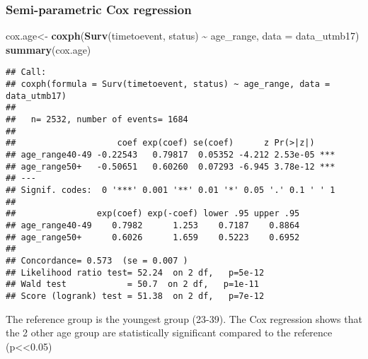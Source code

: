 \documentclass[
]{article}
\newenvironment{Shaded}{\begin{snugshade}}{\end{snugshade}}
\newcommand{\AttributeTok}[1]{\textcolor[rgb]{0.13,0.29,0.53}{#1}}
\newcommand{\FunctionTok}[1]{\textcolor[rgb]{0.13,0.29,0.53}{\textbf{#1}}}
\newcommand{\NormalTok}[1]{#1}
\newcommand{\OtherTok}[1]{\textcolor[rgb]{0.56,0.35,0.01}{#1}}
\newcommand{\SpecialCharTok}[1]{\textcolor[rgb]{0.81,0.36,0.00}{\textbf{#1}}}
\begin{document}
\hypertarget{semi-parametric-cox-regression}{%
\subsubsection{Semi-parametric Cox
regression}\label{semi-parametric-cox-regression}}

\begin{Shaded}
\begin{Highlighting}[]
\NormalTok{cox.age}\OtherTok{\textless{}{-}} \FunctionTok{coxph}\NormalTok{(}\FunctionTok{Surv}\NormalTok{(timetoevent, status) }\SpecialCharTok{\textasciitilde{}}\NormalTok{ age\_range, }\AttributeTok{data =}\NormalTok{ data\_utmb17)}
\FunctionTok{summary}\NormalTok{(cox.age)}
\end{Highlighting}
\end{Shaded}

\begin{verbatim}
## Call:
## coxph(formula = Surv(timetoevent, status) ~ age_range, data = data_utmb17)
## 
##   n= 2532, number of events= 1684 
## 
##                    coef exp(coef) se(coef)      z Pr(>|z|)    
## age_range40-49 -0.22543   0.79817  0.05352 -4.212 2.53e-05 ***
## age_range50+   -0.50651   0.60260  0.07293 -6.945 3.78e-12 ***
## ---
## Signif. codes:  0 '***' 0.001 '**' 0.01 '*' 0.05 '.' 0.1 ' ' 1
## 
##                exp(coef) exp(-coef) lower .95 upper .95
## age_range40-49    0.7982      1.253    0.7187    0.8864
## age_range50+      0.6026      1.659    0.5223    0.6952
## 
## Concordance= 0.573  (se = 0.007 )
## Likelihood ratio test= 52.24  on 2 df,   p=5e-12
## Wald test            = 50.7  on 2 df,   p=1e-11
## Score (logrank) test = 51.38  on 2 df,   p=7e-12
\end{verbatim}

The reference group is the youngest group (23-39). The Cox regression
shows that the 2 other age group are statistically significant compared
to the reference (p\textless\textless0.05)
\end{document}
